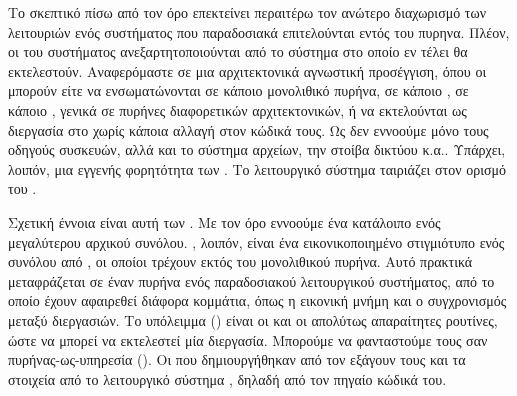 Το σκεπτικό πίσω από τον όρο  επεκτείνει περαιτέρω τον ανώτερο διαχωρισμό
των λειτουριών ενός συστήματος που παραδοσιακά επιτελούνται εντός του πυρηνα.
Πλέον, οι  του συστήματος
ανεξαρτητοποιούνται από το σύστημα στο οποίο εν τέλει θα
εκτελεστούν. Αναφερόμαστε σε μια αρχιτεκτονικά αγνωστική
προσέγγιση, όπου οι  μπορούν είτε να ενσωματώνονται
σε κάποιο μονολιθικό πυρήνα, σε κάποιο , σε
κάποιο , γενικά σε πυρήνες διαφορετικών αρχιτεκτονικών,
ή να εκτελούνται ως διεργασία στο  χωρίς κάποια
αλλαγή στον κώδικά τους. Ως  δεν εννοούμε μόνο τους
οδηγούς συσκευών, αλλά και το σύστημα αρχείων, την στοίβα
δικτύου κ.α.. Υπάρχει, λοιπόν, μια εγγενής φορητότητα των
\cite{noOSnoProb}. Το λειτουργικό σύστημα  ταιριάζει στον
ορισμό του \cite{interviewKantee}.
\newline

Σχετική έννοια είναι αυτή των . Με τον όρο 
εννοούμε ένα κατάλοιπο ενός μεγαλύτερου αρχικού συνόλου.
, λοιπόν, είναι ένα εικονικοποιημένο στιγμιότυπο
ενός συνόλου από , οι οποίοι τρέχουν εκτός του
μονολιθικού πυρήνα. Αυτό πρακτικά μεταφράζεται σε έναν
πυρήνα ενός παραδοσιακού λειτουργικού συστήματος, από
το οποίο έχουν αφαιρεθεί διάφορα κομμάτια, όπως η εικονική
μνήμη και ο συγχρονισμός μεταξύ διεργασιών. Το υπόλειμμα
() είναι οι  και οι απολύτως απαραίτητες ρουτίνες, ώστε
να μπορεί να εκτελεστεί μία διεργασία\cite{Orestis}. Μπορούμε να φανταστούμε
τους  σαν πυρήνας-ως-υπηρεσία ().
Οι  που δημιουργήθηκαν από τον 
εξάγουν τους  και τα στοιχεία από το λειτουργικό σύστημα
, δηλαδή από τον  πηγαίο κώδικά του\cite{interviewKantee}.
\newline

